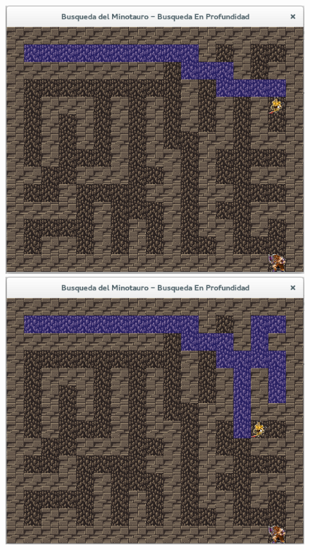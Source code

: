 \documentclass[letter, titlepage, 10pt]{article}
\begin{document}
\begin{appendices}
      \begin{figure}[H]
  \centering
    \begin{minipage}{.5\textwidth}
        \centering
        \includegraphics[width=0.8\linewidth]{images/bep_01}
    \end{minipage}%
    \begin{minipage}{.5\textwidth}
        \centering
        \includegraphics[width=0.8\linewidth]{images/bep_02}
    \end{minipage}
\end{figure}


\end{appendices}
\end{document}
